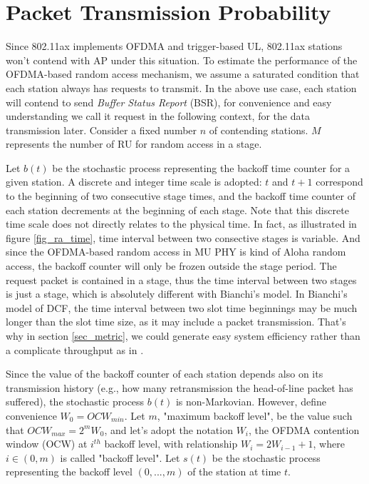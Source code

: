 \section{Packet Transmission Probability} \label{sec_model}
Since 802.11ax implements OFDMA and trigger-based UL, 802.11ax stations won't contend with AP under this situation.
To estimate the performance of the OFDMA-based random access mechanism, we assume a saturated condition that each station always has requests to transmit.
In the above use case, each station will contend to send \textit{Buffer Status Report} (BSR), for convenience and easy understanding we call it request in the following context, for the data transmission later. 
Consider a fixed number $n$ of contending stations. 
$M$ represents the number of RU for random access in a stage. 


Let $b(t)$ be the stochastic process representing the backoff time counter for a given station.
A discrete and integer time scale is adopted: $t$ and $t+1$ correspond to the beginning of two consecutive stage times, and the backoff time counter of each station decrements at the beginning of each stage.
Note that this discrete time scale does not directly relates to the physical time.
In fact, as illustrated in figure \ref{fig_ra_time}, time interval between two consective stages is variable.
And since the OFDMA-based random access in MU PHY is kind of Aloha random access, the backoff counter will only be frozen outside the stage period. 
The request packet is contained in a stage, thus the time interval between two stages is just a stage, which is absolutely different with Bianchi's model.
In Bianchi's model of DCF, the time interval between two slot time beginnings may be much longer than the slot time size, as it may include a packet transmission. 
That's why in section \ref{sec_metric}, we could generate easy system efficiency rather than a complicate throughput as in \cite{bianchi2000performance}.

Since the value of the backoff counter of each station depends also on its transmission history (e.g., how many retransmission the head-of-line packet has suffered), the stochastic process $b(t)$ is non-Markovian.
However, define convenience $W_0=OCW_{min}$. 
Let $m$, "maximum backoff level", be the value such that $OCW_{max}=2^mW_0$, and let's adopt the notation $W_i$, the OFDMA contention window (OCW) at $i^{th}$ backoff level, with relationship $W_i = 2W_{i-1}+1$, where $i\in (0,m)$ is called "backoff level".
Let $s(t)$ be the stochastic process representing the backoff level $(0,...,m)$ of the station at time $t$.

